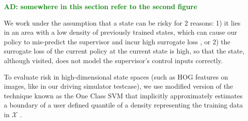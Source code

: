\documentclass[10pt, conference]{ieeeconf}      %
\newcommand{\adnote}[1]{\ifthenelse{\boolean{include-notes}}%
 {\textcolor{green}{\textbf{AD: #1}}}{}}
\newcommand{\fpnote}[1]{\ifthenelse{\boolean{include-notes}}%
 {\textcolor{blue}{\textbf{FP: #1}}}{}}
\begin{document}
\adnote{somewhere in this section refer to the second figure}

We work under the assumption that a state can be risky for 2 reasons: 1) it lies in an area with a low density of
previously trained states, which can cause our policy to mis-predict the supervisor and incur high surrogate
loss \cite{tokdar2010importance}, or 2) the surrogate loss of the current policy at the current state is high, so that the state, although visited, does
not model the supervisor's control inputs correctly. 





To evaluate risk in high-dimensional state spaces (such as HOG features on images, like in our driving simulator testcase), we use
modified version of the technique known as the One Class SVM that implicitly approximately estimates a boundary of a user defined quantile of
a density representing the training data in $\mathcal{X}$ \cite{scholkopf2001estimating}.
\end{document}
